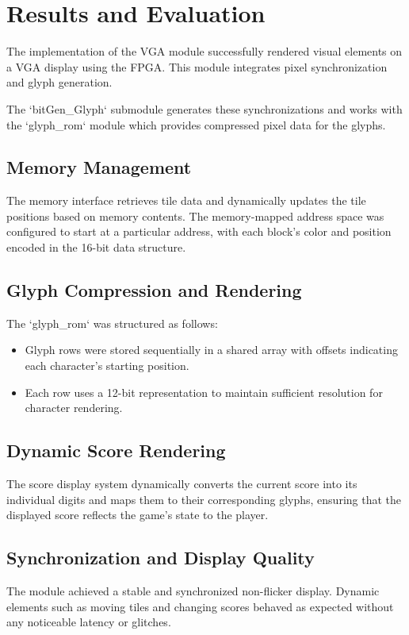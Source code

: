 \documentclass{subfile}
\begin{document}
\section{Results and Evaluation}

The implementation of the VGA module successfully rendered visual elements on a VGA display using the FPGA. This module integrates pixel synchronization and glyph generation.

The `bitGen_Glyph` submodule generates these synchronizations and works with the `glyph_rom` module which provides compressed pixel data for the glyphs.

\subsection{Memory Management}
The memory interface retrieves tile data and dynamically updates the tile positions based on memory contents. The memory-mapped address space was configured to start at a particular address, with each block's color and position encoded in the 16-bit data structure. 

\subsection{Glyph Compression and Rendering}
The `glyph_rom` was structured as follows:
\begin{itemize}
    \item Glyph rows were stored sequentially in a shared array with offsets indicating each character's starting position.
    \item Each row uses a 12-bit representation to maintain sufficient resolution for character rendering.
\end{itemize}

\subsection{Dynamic Score Rendering}
The score display system dynamically converts the current score into its individual digits and maps them to their corresponding glyphs, ensuring that the displayed score reflects the game's state to the player. 

\subsection{Synchronization and Display Quality}
The module achieved a stable and synchronized non-flicker display. Dynamic elements such as moving tiles and changing scores behaved as expected without any noticeable latency or glitches.
\end{document}
